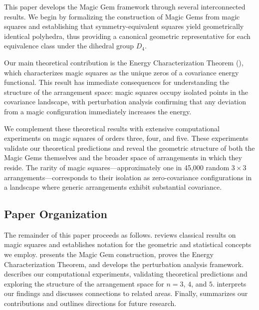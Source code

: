 This paper develops the Magic Gem framework through several interconnected results.
We begin by formalizing the construction of Magic Gems from magic squares
and establishing that symmetry-equivalent squares yield geometrically identical polyhedra,
thus providing a canonical geometric representative for each equivalence class under the dihedral group $D_4$.

Our main theoretical contribution is the Energy Characterization Theorem (), 
which characterizes magic squares as the unique zeros of a covariance energy functional.
This result has immediate consequences for understanding the structure of the arrangement space:
magic squares occupy isolated points in the covariance landscape, 
with perturbation analysis confirming that any deviation from a magic configuration 
immediately increases the energy.

We complement these theoretical results with extensive computational experiments on magic squares 
of orders three, four, and five.
These experiments validate our theoretical predictions and reveal the geometric structure 
of both the Magic Gems themselves and the broader space of arrangements in which they reside.
The rarity of magic squares---approximately one in 45,000 random $3 \times 3$ arrangements---corresponds 
to their isolation as zero-covariance configurations in a landscape where generic arrangements 
exhibit substantial covariance.

\subsection{Paper Organization}

The remainder of this paper proceeds as follows.
 reviews classical results on magic squares and establishes notation 
for the geometric and statistical concepts we employ.
 presents the Magic Gem construction, proves the Energy Characterization Theorem,
and develops the perturbation analysis framework.
 describes our computational experiments, validating theoretical predictions 
and exploring the structure of the arrangement space for $n = 3$, $4$, and $5$.
 interprets our findings and discusses connections to related areas.
Finally,  summarizes our contributions and outlines directions for future research.

